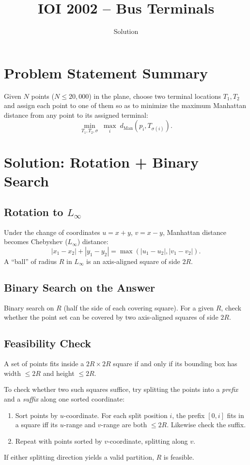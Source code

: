 \documentclass[11pt,a4paper]{article}
\title{IOI 2002 -- Bus Terminals}
\author{Solution}
\date{}
\begin{document}
\maketitle

\section{Problem Statement Summary}
Given $N$ points ($N \le 20{,}000$) in the plane, choose two terminal
locations $T_1, T_2$ and assign each point to one of them so as to
minimize the maximum Manhattan distance from any point to its assigned
terminal:
\[
  \min_{T_1,T_2,\sigma}\; \max_{i}\; d_{\text{Man}}(p_i, T_{\sigma(i)}).
\]

\section{Solution: Rotation + Binary Search}

\subsection{Rotation to $L_\infty$}
Under the change of coordinates $u = x + y$, $v = x - y$, Manhattan
distance becomes Chebyshev ($L_\infty$) distance:
\[
  |x_1 - x_2| + |y_1 - y_2| = \max(|u_1 - u_2|, |v_1 - v_2|).
\]
A ``ball'' of radius $R$ in $L_\infty$ is an axis-aligned square of
side $2R$.

\subsection{Binary Search on the Answer}
Binary search on $R$ (half the side of each covering square). For a
given $R$, check whether the point set can be covered by two
axis-aligned squares of side $2R$.

\subsection{Feasibility Check}
A set of points fits inside a $2R \times 2R$ square if and only if its
bounding box has width $\le 2R$ and height $\le 2R$.

To check whether two such squares suffice, try splitting the points
into a \emph{prefix} and a \emph{suffix} along one sorted coordinate:
\begin{enumerate}
  \item Sort points by $u$-coordinate. For each split position $i$,
        the prefix $[0,i]$ fits in a square iff its $u$-range and
        $v$-range are both $\le 2R$. Likewise check the suffix.
  \item Repeat with points sorted by $v$-coordinate, splitting along $v$.
\end{enumerate}
If either splitting direction yields a valid partition, $R$ is feasible.
\end{document}
